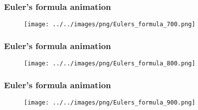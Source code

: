 \begin{frame}[t]

	\frametitle{Euler's formula animation}

	\begin{figure}
		\texttt{[image: ../../images/png/Eulers\_formula\_700.png]}
	\end{figure}

\end{frame}

\begin{frame}[t]

	\frametitle{Euler's formula animation}

	\begin{figure}
		\texttt{[image: ../../images/png/Eulers\_formula\_800.png]}
	\end{figure}

\end{frame}

\begin{frame}[t]

	\frametitle{Euler's formula animation}

	\begin{figure}
		\texttt{[image: ../../images/png/Eulers\_formula\_900.png]}
	\end{figure}

\end{frame}


